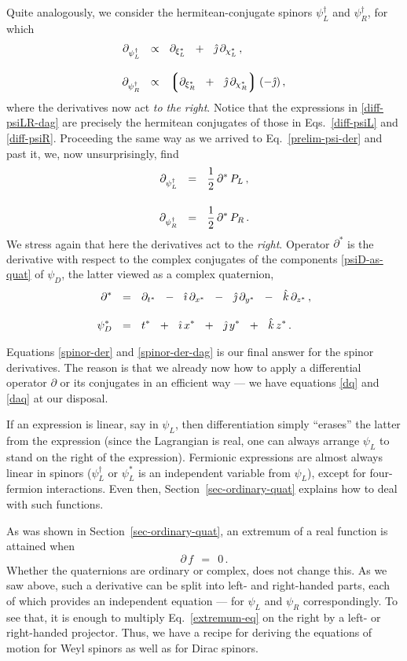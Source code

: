\documentclass[epsfig,12pt]{article}
\newcommand{\p}{\partial}
\newcommand{\lgr}{\left\lgroup}
\newcommand{\rgr}{\right\rgroup}
\newcommand{\ii}{\hat\imath}
\newcommand{\jj}{\hat\jmath}
\newcommand{\kk}{\hat k}
\begin{document}
	Quite analogously, we consider the hermitean-conjugate spinors $ \psi_L^\dag $ and $ \psi_R^\dag $,
	for which
\begin{align}
%
\notag
	\p_{\psi_L^\dag}	& ~~\propto~~	\p_{\xi_L^*}  ~~+~~  \jj\,\p_{\chi_L^*}\,,
	\\[3mm]
%
\label{diff-psiLR-dag}
	\p_{\psi_R^\dag}	& ~~\propto~~	\lgr \p_{\xi_R^*}  ~~+~~ \jj\,\p_{\chi_R^*} \rgr (-\jj)\,,
\end{align}
	where the derivatives now act \emph{to the right}.
	Notice that the expressions in \eqref{diff-psiLR-dag} are precisely the hermitean conjugates
	of those in Eqs.~\eqref{diff-psiL} and \eqref{diff-psiR}.
	Proceeding the same way as we arrived to Eq.~\eqref{prelim-psi-der} and past it,
	we, now unsurprisingly, find
\begin{align}
%
\notag
	\p_{\psi_L^\dag}	& ~~=~~		\frac 1 2\, \p^*\, P_L\,,
	\\[4mm]
%
\label{spinor-der-dag}
	\p_{\psi_R^\dag}	& ~~=~~		\frac 1 2\, \p^*\, P_R\,.
\end{align}
	We stress again that here the derivatives act to the \emph{right}.
	Operator $ \p^* $ is the derivative with respect to the complex conjugates of the
	components \eqref{psiD-as-quat} of $ \psi_D $,
	the latter viewed as a complex quaternion,
\begin{align}
%
\notag
	\p^*		& ~~=~~	 \p_{t^*}  ~~-~~  \ii\,\p_{x^*}  ~~-~~  \jj\,\p_{y^*}  ~~-~~  \kk\,\p_{z^*}\,,
	\\[3mm]
%
	\psi_D^*	& ~~=~~  t^*  ~~+~~  \ii\,x^*  ~~+~~  \jj\,y^*  ~~+~~  \kk\,z^*\,.
\end{align}

	Equations \eqref{spinor-der} and \eqref{spinor-der-dag} is our final answer
	for the spinor derivatives.
	The reason is that we already now how to apply a differential operator $ \p $
	or its conjugates in an efficient way --- we have equations \eqref{dq} and \eqref{daq}
	at our disposal.

	If an expression is linear, say in $ \psi_L $, then differentiation
	simply ``erases'' the latter from the expression
	(since the Lagrangian is real, one can always arrange $ \psi_L $ to stand
	on the right of the expression).
	Fermionic expressions are almost always linear in spinors ($ \psi_L^\dag $ or
	$ \psi_L^* $ is an independent variable from $ \psi_L $),
	except for four-fermion interactions.
	Even then, Section~\ref{sec-ordinary-quat} explains how to deal with such functions.

	As was shown in Section~\ref{sec-ordinary-quat}, an extremum of a real function
	is attained when
\begin{equation}
\label{extremum-eq}
	\p\,f	~~=~~	0\,.
\end{equation}
	Whether the quaternions are ordinary or complex, does not change this.
	As we saw above, such a derivative can be split into left- and right-handed parts,
	each of which provides an independent equation --- for $ \psi_L $ and $ \psi_R $
	correspondingly.
	To see that, it is enough to multiply Eq.~\eqref{extremum-eq}
	on the right by a left- or right-handed projector.
	Thus, we have a recipe for deriving the equations of motion for Weyl spinors
	as well as for Dirac spinors.
\end{document}
